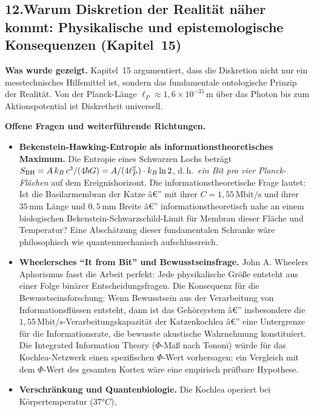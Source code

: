 ﻿\documentclass[12pt,a4paper,titlepage]{report}
\begin{document}
\subsection*{12.\enspace Warum Diskretion der Realität näher kommt:
Physikalische und epistemologische Konsequenzen (Kapitel~15)}

\textbf{Was wurde gezeigt.}
Kapitel~15 argumentiert, dass die Diskretion nicht nur
ein messtech\-nisches Hilfsmittel ist, sondern das fundamentale
ontologische Prinzip der Realität.
Von der Planck-Länge $\ell_P \approx 1{,}6\times10^{-35}\,\mathrm{m}$
über das Photon bis zum Aktionspotential ist Diskretheit
universell.

\textbf{Offene Fragen und weiterführende Richtungen.}
\begin{itemize}[leftmargin=2em]
  \item \textbf{Bekenstein-Hawking-Entropie als informationstheoretisches Maximum.}
    Die Entropie eines Schwarzen Lochs beträgt
    $S_{\rm BH} = A\,k_B\,c^3/(4\hbar G) = A/(4\ell_P^2) \cdot k_B\ln2$,
    d.\,h.\ \emph{ein Bit pro vier Planck-Flächen} auf dem Ereignishorizont.
    Die informationstheoretische Frage lautet:
    Ist die Basilarmembran der Katze â€”
    mit ihrer $C = 1{,}55\,\mathrm{Mbit/s}$ und ihrer
    $35\,\mathrm{mm}$ Länge und $0{,}5\,\mathrm{mm}$ Breite â€”
    informationstheoretisch nahe an einem biologischen
    Bekenstein-Schwarzschild-Limit für Membran dieser Fläche und Temperatur?
    Eine Abschätzung dieser fundamentalen Schranke wäre
    philosophisch wie quantenmechanisch aufschlussreich.
  \item \textbf{Wheelersches ``It from Bit'' und Bewusstseinsfrage.}
    John A. Wheelers Aphorismus fasst die Arbeit perfekt:
    Jede physikalische Größe entsteht aus einer Folge binärer
    Entscheidungsfragen.
    Die Konsequenz für die Bewusstseinsforschung:
    Wenn Bewusstsein aus der Verarbeitung von Informationsflüssen
    entsteht, dann ist das Gehörsystem â€” insbesondere die
    $1{,}55\,\mathrm{Mbit/s}$-Verarbeitungskapazität
    der Katzenkochlea â€” eine Untergrenze für die
    Informationsrate, die bewusste akustische Wahrnehmung konstituiert.
    Die Integrated Information Theory ($\Phi$-Maß nach Tononi)
    würde für das Kochlea-Netzwerk einen
    spezifischen $\Phi$-Wert vorhersagen;
    ein Vergleich mit dem $\Phi$-Wert des gesamten Kortex
    wäre eine empirisch prüfbare Hypothese.
  \item \textbf{Verschränkung und Quantenbiologie.}
    Die Kochlea operiert bei Körpertemperatur ($37 °C$),

\end{itemize}
\end{document}

